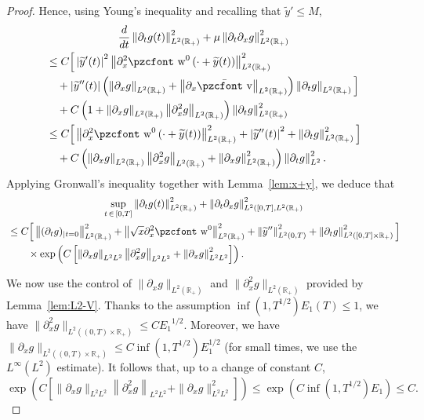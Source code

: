 \documentclass[10pt]{amsart}
\theoremstyle{definition}\newtheorem{defi}[theo]{Definition}\newtheorem{rema}[theo]{Remark}\newtheorem{exam}[theo]{Example}\newtheorem{exem}[theo]{Example}\newtheorem{nota}[theo]{Notation}
\newcommand{\mathpzc}[1]{\text{\pzcfont #1}}
\newcommand{\R}{\mathbb{R}}
\newcommand{\p}{\partial}
\newcommand{\bv}{\bar{\mathpzc{v}}}
\newcommand{\tw}{\mathpzc{w}}
\newcommand{\ty}{\widetilde{y}}
\begin{document}
\begin{proof}
Hence, using Young's inequality and recalling that $\ty'\leq M$,
\begin{multline*}
 \dfrac{d}{dt} \left\|\partial_tg(t)\right\|_{L^2(\R_+)}^2 +\mu \left\|\partial_t \partial_xg\right\|_{L^2(\R_+)}^2 \\
\begin{aligned}
&\leq C \Big[\left|\ty'(t)\right|^2 \left\|\partial^2_x \tw^0\left(\cdot + \ty(t)\right)\right\|_{L^2(\R_+)}^2 \\
&\quad+\left|\ty''(t)\right|\left(\left\|\p_x g\right\|_{L^2(\R_+)} + \left\|\p_x \bv\right\|_{L^2(\R_+)}\right)\left\|\p_t g\right\|_{L^2(\R_+)}\Big]\\
&\quad + C\left(1+ \left\|\partial_xg\right\|_{L^2(\R_+)}\left\|\partial_x^2g\right\|_{L^2(\R_+)}\right) \left\|\partial_t g\right\|_{L^2(\R_+)}^2\\
&\leq C\Big[\left\|\partial^2_x \tw^0\left(\cdot + \ty(t)\right)\right\|_{L^2(\R_+)}^2 +\left|\ty''(t)\right|^2 + \left\|\p_t g\right\|_{L^2(\R_+)}^2\Big]\\
&\quad + C \left(\left\|\partial_xg\right\|_{L^2(\R_+)}\left\|\partial_x^2g\right\|_{L^2(\R_+)} + \left\|\p_x g\right\|_{L^2(\R_+)}^2\right) \left\|\p_t g\right\|_{L^2}^2.
\end{aligned}
\end{multline*}
Applying Gronwall's inequality together with Lemma~\ref{lem:x+y}, we deduce that
\begin{multline*}
 \sup_{t\,\in\,[0,T]} \left\|\partial_tg(t)\right\|_{L^2(\R_+)}^2 + \left\|\partial_t \partial_xg\right\|_{L^2([0,T],L^2(\R_+)}^2 \\
\begin{aligned}
& \leq C\Big[\left\|(\partial_tg)_{|t=0}\right\|_{L^2(\R_+)}^2 + \left\|\sqrt{x} \partial^2_x \tw^0\right\|_{L^2(\R_+)}^2 + \left\|\ty''\right\|_{L^2(0,T)}^2 + \left\|\p_t g\right\|_{L^2\left([0,T]\times \R_+\right)}^2\Big] \\
& \qquad \times \exp\left(C\left[\left\|\partial_xg\right\|_{L^2L^2}\left\|\partial^2_xg\right\|_{L^2L^2} + \left\|\p_x g\right\|_{L^2L^2}^2\right]\right).
\end{aligned}
\end{multline*}



We now use the control of $\|\p_xg\|_{L^2(\R_+)}$ and $\|\p_x^2g\|_{L^2(\R_+)}$ provided by Lemma~\ref{lem:L2-V}. Thanks to the assumption $\inf (1,T^{1/2}) E_1(T)\leq 1$, we have $ \|\p_x^2g\|_{L^2((0,T)\times \R_+)}\leq C { E_1}^{1/2}$. Moreover, we have $\|\p_xg\|_{L^2((0,T)\times \R_+)}\leq C\inf(1, T^{1/2}) E_1^{1/2}$ (for small times, we use the $L^\infty(L^2)$ estimate). It follows that, up to a change of constant $C$,
\[
\exp\left(C\left[\|\partial_xg\|_{L^2L^2}\left\|\partial^2_xg\right\|_{L^2L^2} + \|\p_x g\|_{L^2L^2}^2\right]\right) \leq \exp\left(C\inf\left(1, T^{1/2}\right) E_1\right) \leq C.
\]


\end{proof}
\end{document}
